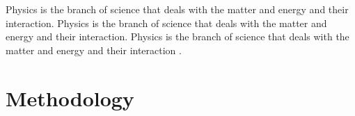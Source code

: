 \documentclass[10pt]{article}
\begin{document}
\begin{tcolorbox}[title = Definition of Physics, skin=standard jigsaw, sharp corners, colback=blue!10, colframe=blue!50, boxrule=0pt]
    Physics is the branch of science that deals with the matter and energy and their interaction. Physics is the branch of science that deals with the matter and energy and their interaction. Physics is the branch of science that deals with the matter and energy and their interaction \cite{arpagaus2018high}.
\end{tcolorbox}










































































\newpage
\section{Methodology}
\end{document}
